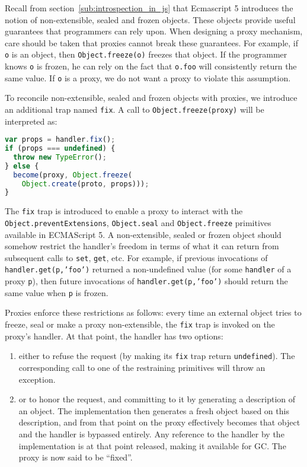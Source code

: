 \documentclass{acm_proc_article-sp}
\begin{document}
Recall from section~\ref{sub:introspection_in_js} that Ecmascript 5 introduces the notion of non-extensible, sealed and frozen objects. These objects provide useful guarantees that programmers can rely upon. When designing a proxy mechanism, care should be taken that proxies cannot break these guarantees. For example, if \texttt{o} is an object, then \texttt{Object.freeze(o)} freezes that object. If the programmer knows \texttt{o} is frozen, he can rely on the fact that \texttt{o.foo} will consistently return the same value. If \texttt{o} is a proxy, we do not want a proxy to violate this assumption.

To reconcile non-extensible, sealed and frozen objects with proxies, we introduce an additional trap named \texttt{fix}. A call to \texttt{Object.freeze(proxy)} will be interpreted as:

\begin{lstlisting}[language=javascript]
var props = handler.fix();
if (props === undefined) {
  throw new TypeError();
} else {
  become(proxy, Object.freeze(
    Object.create(proto, props)));
}
\end{lstlisting}

The \texttt{fix} trap is introduced to enable a proxy to interact with the \texttt{Object.preventExtensions}, \texttt{Object.seal} and \texttt{Object.freeze} primitives available in ECMAScript 5. A non-extensible, sealed or frozen object should somehow restrict the handler’s freedom in terms of what it can return from subsequent calls to \texttt{set}, \texttt{get}, etc. For example, if previous invocations of \texttt{handler.get(p,'foo')} returned a non-undefined value (for some \texttt{handler} of a proxy \texttt{p}), then future invocations of \texttt{handler.get(p,'foo')} should return the same value when \texttt{p} is frozen.

Proxies enforce these restrictions as follows: every time an external object tries to freeze, seal or make a proxy non-extensible, the \texttt{fix} trap is invoked on the proxy’s handler. At that point, the handler has two options:
\begin{enumerate}
  \item either to refuse the request (by making its \texttt{fix} trap return \texttt{undefined}). The corresponding call to one of the restraining primitives will throw an exception.
  \item or to honor the request, and committing to it by generating a description of an object. The implementation then generates a fresh object based on this description, and from that point on the proxy effectively becomes that object and the handler is bypassed entirely. Any reference to the handler by the implementation is at that point released, making it available for GC. The proxy is now said to be ``fixed''.
\end{enumerate}
\end{document}
